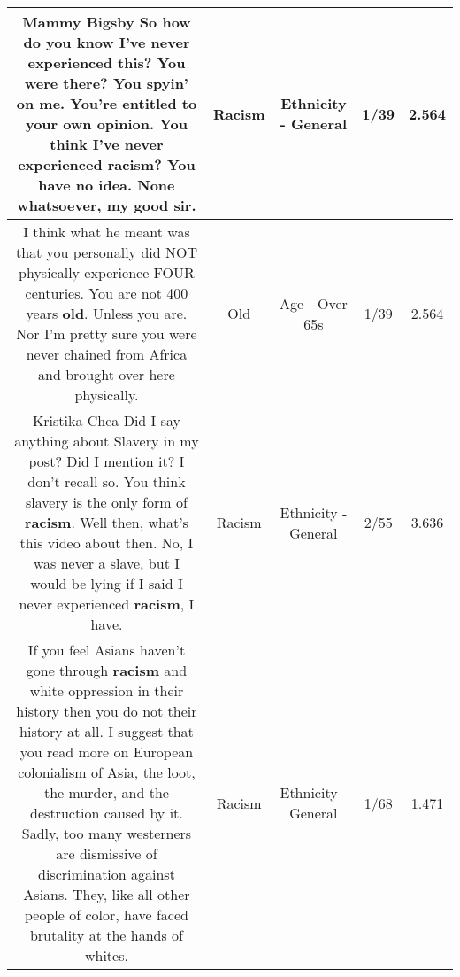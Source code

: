 \documentclass[11pt]{article}
\newlength\mylength
\begin{document}
\begin{center}
\begin{longtable}{|C{.65\mylength}|C{.30\mylength}|C{.12\mylength}|C{.12\mylength}|C{.12\mylength}|}
  \small Mammy Bigsby So how do you know I've never experienced this? You were there? You spyin' on me. You're entitled to your own opinion. You think I've never experienced \textbf{racism}? You have no idea. None whatsoever, my good sir.\normalsize   & Racism & Ethnicity - General & 1/39 & 2.564 \\  \hline
  \small I think what he meant was that you personally did NOT physically experience FOUR centuries. You are not 400  years \textbf{old}. Unless you are. Nor I'm pretty sure you were never chained from Africa and brought over here physically.\normalsize   & Old & Age - Over 65s & 1/39 & 2.564 \\  \hline
  \small Kristika Chea Did I say anything about Slavery in my post? Did I mention it? I don't recall so. You think slavery is the only form of \textbf{racism}. Well then, what's this video about then. No, I was never a slave, but I would be lying if I said I never experienced \textbf{racism}, I have.\normalsize   & Racism & Ethnicity - General & 2/55 & 3.636 \\  \hline
  \small If you feel Asians haven't gone through \textbf{racism} and white oppression in their history then you do not their history at all. I suggest that you read more on European colonialism of Asia, the loot, the murder, and the destruction caused by it. Sadly, too many westerners are dismissive of discrimination against Asians. They, like all other people of color, have faced brutality at the hands of whites.\normalsize   & Racism & Ethnicity - General & 1/68 & 1.471 \\  \hline

\end{longtable}
\end{center}
\end{document}

